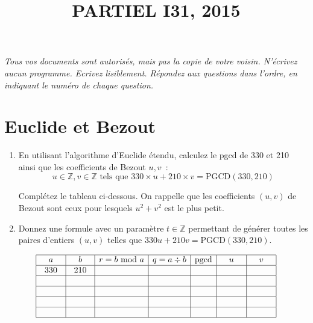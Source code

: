 \documentclass[11pt]{article}
\def\Z{\mathbb Z}
\begin{document}
\title{PARTIEL I31, 2015}
\date{}\maketitle
{\it Tous vos documents sont autorisés, mais pas la copie de votre voisin.
N'écrivez aucun programme.
Ecrivez lisiblement.
Répondez aux questions dans l'ordre, en indiquant le numéro de chaque question.
}




\section{Euclide et Bezout}

\smallskip

\begin{enumerate}
\item  En utilisant l'algorithme d'Euclide étendu, calculez le pgcd de 330 et 210 ainsi que les coefficients de Bezout  $u, v$~:
$$u\in \Z, v\in \Z \mbox{ tels que } 330\times u+210\times v=\mbox{PGCD}(330, 210)$$

Complétez le tableau ci-dessous. On rappelle que les coefficients $(u, v)$ de Bezout sont ceux pour lesquels $u^2 + v^2$ est le plus petit.


\item Donnez une formule avec un paramètre $t\in \Z$ permettant de générer toutes les paires d'entiers  $(u, v)$ telles
que $330u+210v=\mbox{PGCD}(330, 210)$.

\end{enumerate}

\medskip
$$
\begin{array}{|c|c|c|c|c|c|c|}
\hline 
\quad a\quad  &\quad  b\quad  & r=b\mbox{ mod }a & q=a\div b & \mbox{pgcd} & \quad u \quad & \quad v \quad \\ 
\hline 
330 & 210  & &   &   &   & \\
\hline
 & &    &   &   &   & \\
\hline
 & &    &   &   &   & \\
\hline
  & &    &   &   &   & \\
\hline  
 & &    &   &   &   & \\
\hline
\end{array}
$$
\end{document}
